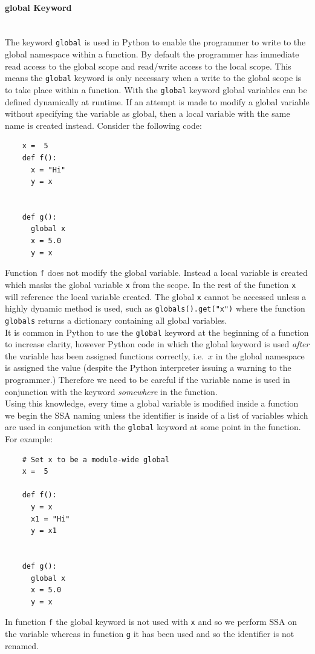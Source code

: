 \documentclass[12pt, titlepage]{article}
\begin{document}
\paragraph*{global Keyword}\mbox{} \\
The keyword \texttt{global} is used in Python to enable the programmer to write to the global namespace within a function. By default the programmer has immediate read access to the global scope and read/write access to the local scope. This means the \texttt{global} keyword is only necessary when a write to the global scope is to take place within a function. With the \texttt{global} keyword global variables can be defined dynamically at runtime. If an attempt is made to modify a global variable without specifying the variable as global, then a local variable with the same name is created instead. Consider the following code:
\begin{lstlisting}
    x =  5
    def f():
      x = "Hi"
      y = x
      
      
    def g():
      global x
      x = 5.0
      y = x
\end{lstlisting}
Function \texttt{f} does not modify the global variable. Instead a local variable is created which masks the global variable \texttt{x} from the scope. In the rest of the function \texttt{x} will reference the local variable created. The global \texttt{x} cannot be accessed unless a highly dynamic method is used, such as \texttt{globals().get("x")} where the function \texttt{globals} returns a dictionary containing all global variables. \\
\indent It is common in Python to use the \texttt{global} keyword at the beginning of a function to increase clarity, however Python code in which the global keyword is used \textit{after} the variable has been assigned functions correctly, i.e.\ $x$ in the global namespace is assigned the value (despite the Python interpreter issuing a warning to the programmer.) Therefore we need to be careful if the variable name is used in conjunction with the keyword \textit{somewhere} in the function. \\
\indent Using this knowledge, every time a global variable is modified inside a function we begin the SSA naming unless the identifier is inside of a list of variables which are used in conjunction with the \texttt{global} keyword at some point in the function. For example:
\begin{lstlisting}
    # Set x to be a module-wide global
    x =  5
    
    def f():
      y = x
      x1 = "Hi"
      y = x1
      
     
    def g():
      global x
      x = 5.0
      y = x
\end{lstlisting}
In function \texttt{f} the global keyword is not used with \texttt{x} and so we perform SSA on the variable whereas in function \texttt{g} it has been used and so the identifier is not renamed.
\end{document}
